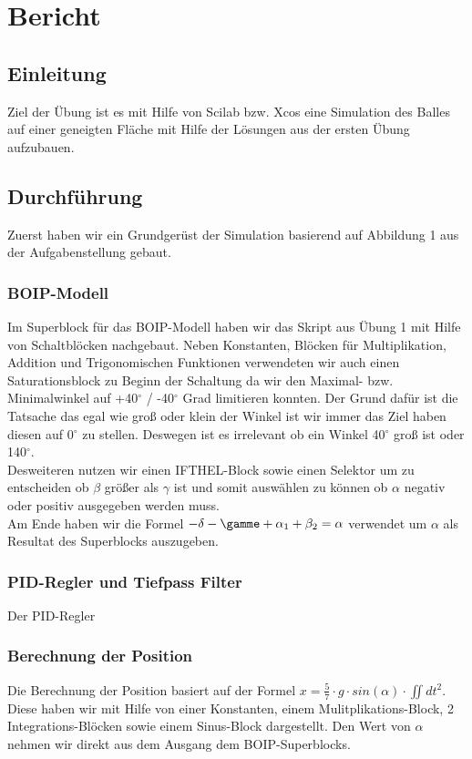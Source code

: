 \section{Bericht}

\subsection{Einleitung}
Ziel der Übung ist es mit Hilfe von Scilab bzw. Xcos eine Simulation des Balles auf einer geneigten Fläche mit Hilfe der Lösungen aus der ersten Übung aufzubauen.

\subsection{Durchführung}
Zuerst haben wir ein Grundgerüst der Simulation basierend auf Abbildung 1 aus der Aufgabenstellung gebaut.

\subsubsection{BOIP-Modell}
Im Superblock für das BOIP-Modell haben wir das Skript aus Übung 1 mit Hilfe von Schaltblöcken nachgebaut. Neben Konstanten, Blöcken für Multiplikation, Addition und Trigonomischen Funktionen verwendeten wir auch einen Saturationsblock zu Beginn der Schaltung da wir den Maximal- bzw. Minimalwinkel auf +40$^\circ$ / -40$^\circ$ Grad limitieren konnten. Der Grund dafür ist die Tatsache das egal wie groß oder klein der Winkel ist wir immer das Ziel haben diesen auf 0$^\circ$ zu stellen. Deswegen ist es irrelevant ob ein Winkel 40$^\circ$ groß ist oder 140$^\circ$. \\
Desweiteren nutzen wir einen IFTHEL-Block sowie einen Selektor um zu entscheiden ob $\beta$ größer als $\gamma$ ist und somit auswählen zu können ob $\alpha$ negativ oder positiv ausgegeben werden muss. \\
Am Ende haben wir die Formel $ - \delta - \gamme + \alpha_1 + \beta_2 = \alpha $ verwendet um $\alpha$ als Resultat des Superblocks auszugeben.

\subsubsection{PID-Regler und Tiefpass Filter}
Der PID-Regler 

\subsubsection{Berechnung der Position}
Die Berechnung der Position basiert auf der Formel $ x = \frac{5}{7} \cdot g \cdot sin(\alpha) \cdot \iint d t^2 $. Diese haben wir mit Hilfe von einer Konstanten, einem Mulitplikations-Block, 2 Integrations-Blöcken sowie einem Sinus-Block dargestellt. Den Wert von $\alpha $ nehmen wir direkt aus dem Ausgang dem BOIP-Superblocks.

